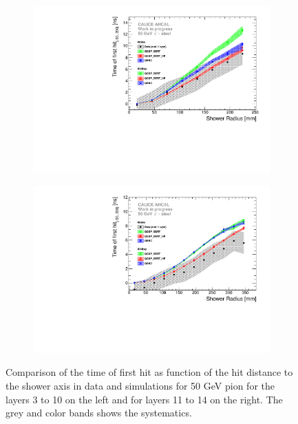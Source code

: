 \begin{figure}[htbp!]
	\begin{subfigure}[t]{0.5\textwidth}
		\centering
		\includegraphics[width=1\textwidth]{../Thesis_Plots/Timing/Pions/Plots/ComparisonToSim/Time_Radius_50GeV_SSF.pdf}
		\caption{} \label{fig:Radius_SSF_SimData_50GeV}
	\end{subfigure}
	\hfill
	\begin{subfigure}[t]{0.5\textwidth}
		\centering
		\includegraphics[width=1\textwidth]{../Thesis_Plots/Timing/Pions/Plots/ComparisonToSim/Time_Radius_50GeV_BL.pdf}
		\caption{} \label{fig:Radius_BL_SimData_50GeV}
	\end{subfigure}
	\caption{Comparison of the time of first hit as function of the hit distance to the shower axis in data and simulations for 50 GeV pion for the layers 3 to 10 on the left and for layers 11 to 14 on the right. The grey and color bands shows the systematics.}
	\label{fig:Radius_SSF_SimData_50GeVComparison}
\end{figure}

